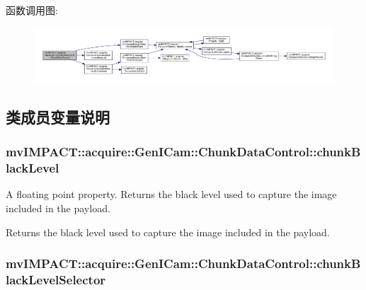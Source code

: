 函数调用图\+:
\nopagebreak
\begin{figure}[H]
\begin{center}
\leavevmode
\includegraphics[width=350pt]{classmv_i_m_p_a_c_t_1_1acquire_1_1_gen_i_cam_1_1_chunk_data_control_aa4dbe6191aa44650f68e0a5c6bb3926c_cgraph}
\end{center}
\end{figure}




\subsection{类成员变量说明}
\hypertarget{classmv_i_m_p_a_c_t_1_1acquire_1_1_gen_i_cam_1_1_chunk_data_control_a6d6b7d5f4bb92ae9f7d780d262ecd016}{
\subsubsection[{chunk\+Black\+Level}]{ mv\+I\+M\+P\+A\+C\+T\+::acquire\+::\+Gen\+I\+Cam\+::\+Chunk\+Data\+Control\+::chunk\+Black\+Level}}\label{classmv_i_m_p_a_c_t_1_1acquire_1_1_gen_i_cam_1_1_chunk_data_control_a6d6b7d5f4bb92ae9f7d780d262ecd016}


A floating point property. Returns the black level used to capture the image included in the payload. 

Returns the black level used to capture the image included in the payload. \hypertarget{classmv_i_m_p_a_c_t_1_1acquire_1_1_gen_i_cam_1_1_chunk_data_control_a63720c40901053497a17d6e30e95070a}{
\subsubsection[{chunk\+Black\+Level\+Selector}]{ mv\+I\+M\+P\+A\+C\+T\+::acquire\+::\+Gen\+I\+Cam\+::\+Chunk\+Data\+Control\+::chunk\+Black\+Level\+Selector}}\label{classmv_i_m_p_a_c_t_1_1acquire_1_1_gen_i_cam_1_1_chunk_data_control_a63720c40901053497a17d6e30e95070a}


